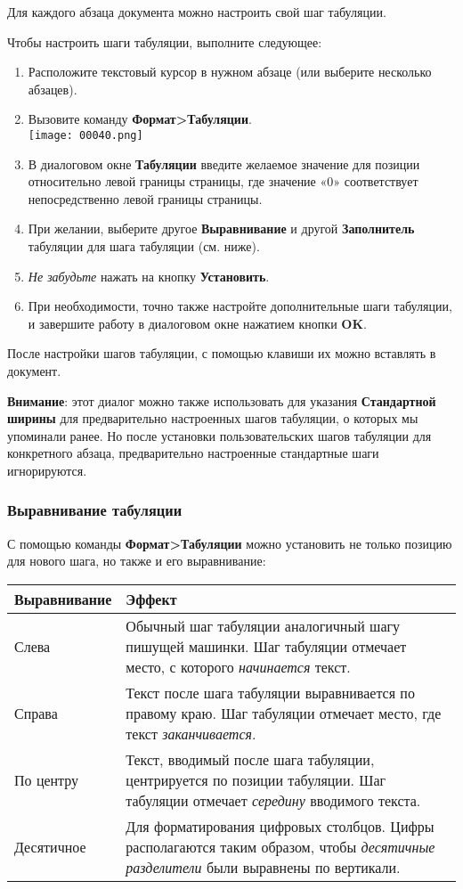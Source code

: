 ﻿\documentclass[a4paper,10pt]{article}
\begin{document}
Для каждого абзаца документа можно настроить свой шаг табуляции.

Чтобы настроить шаги табуляции, выполните следующее:
\begin{enumerate}
 \item Расположите текстовый курсор в нужном абзаце (или выберите несколько абзацев).
 \item Вызовите команду \textbf{Формат>Табуляции}.\\
 \texttt{[image: 00040.png]}
 \item В диалоговом окне \textbf{Табуляции} введите желаемое значение для позиции относительно левой границы страницы, где значение «0» соответствует непосредственно левой границы страницы.
 \item При желании, выберите другое \textbf{Выравнивание} и другой \textbf{Заполнитель} табуляции для шага табуляции (см. ниже).
 \item \textit{Не забудьте} нажать на кнопку \textbf{Установить}.
 \item При необходимости, точно также настройте дополнительные шаги табуляции, и завершите работу в диалоговом окне нажатием кнопки \textbf{OK}.
\end{enumerate}

После настройки шагов табуляции, с помощью клавиши  их можно вставлять в документ.

\textbf{Внимание}: этот диалог можно также использовать для указания \textbf{Стандартной ширины} для предварительно настроенных шагов табуляции, о которых мы упоминали ранее. Но после установки пользовательских шагов табуляции для конкретного абзаца, предварительно настроенные стандартные шаги игнорируются.

\subsubsection{Выравнивание табуляции}
С помощью команды \textbf{Формат>Табуляции} можно установить не только позицию для нового шага, но также и его выравнивание:

\begin{center}
\begin{tabular}{ | m{4cm} | m{10cm} | }
\hline
 \textbf{Выравнивание} & \textbf{Эффект} \\ 
 \hline
 Слева & Обычный шаг табуляции аналогичный шагу пишущей машинки. Шаг табуляции отмечает место, с которого \textit{начинается} текст.\\
\hline
Справа & Текст после шага табуляции выравнивается по правому краю. Шаг табуляции отмечает место, где текст \textit{заканчивается}.\\
\hline
По центру & Текст, вводимый после шага табуляции, центрируется по позиции табуляции. Шаг табуляции отмечает \textit{середину} вводимого текста.\\
\hline
Десятичное & Для форматирования цифровых столбцов. Цифры располагаются таким образом, чтобы \textit{десятичные разделители} были выравнены по вертикали.\\
\hline
\end{tabular}
\end{center}
\end{document}
